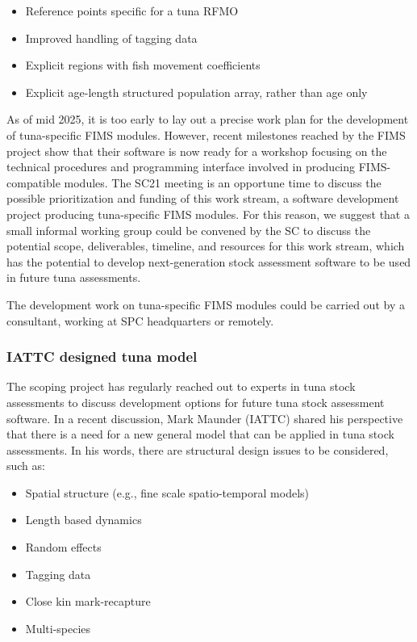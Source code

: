 \documentclass{SCreport}
\begin{document}
\begin{itemize}
  \item Reference points specific for a tuna RFMO\\[-4.5ex]
  \item Improved handling of tagging data\\[-4.5ex]
  \item Explicit regions with fish movement coefficients\\[-4.5ex]
  \item Explicit age-length structured population array, rather than age only
\end{itemize}

As of mid 2025, it is too early to lay out a precise work plan for the
development of tuna-specific FIMS modules. However, recent milestones reached by
the FIMS project show that their software is now ready for a workshop focusing
on the technical procedures and programming interface involved in producing
FIMS-compatible modules. The SC21 meeting is an opportune time to discuss the
possible prioritization and funding of this work stream, a software development
project producing tuna-specific FIMS modules. For this reason, we suggest that a
small informal working group could be convened by the SC to discuss the
potential scope, deliverables, timeline, and resources for this work stream,
which has the potential to develop next-generation stock assessment software to
be used in future tuna assessments.

The development work on tuna-specific FIMS modules could be carried out by a
consultant, working at SPC headquarters or remotely.

\newpage

\subsubsection{IATTC designed tuna model}
\label{sec:iattc-tuna-model}

The scoping project has regularly reached out to experts in tuna stock
assessments to discuss development options for future tuna stock assessment
software. In a recent discussion, Mark Maunder (IATTC) shared his perspective
that there is a need for a new general model that can be applied in tuna stock
assessments. In his words, there are structural design issues to be considered,
such as:

\begin{itemize}
  \item Spatial structure (e.g., fine scale spatio-temporal models)\\[-4.5ex]
  \item Length based dynamics\\[-4.5ex]
  \item Random effects\\[-4.5ex]
  \item Tagging data\\[-4.5ex]
  \item Close kin mark-recapture\\[-4.5ex]
  \item Multi-species
\end{itemize}
\end{document}
